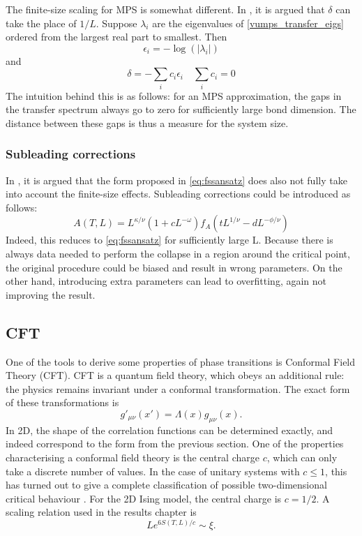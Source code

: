 The finite-size scaling for \Gls{MPS} is somewhat different. In \cite{Vanhecke2019}, it is argued that $\delta$ can take the place of $1/L$. Suppose $\lambda_i$ are the eigenvalues of \cref{vumps_transfer_eigs} ordered from the largest real part to smallest. Then
\begin{equation}
    \epsilon_i = - \log( \left | \lambda_i  \right |  )
\end{equation}
and
\begin{equation} \label{eq:cit_delta}
    \delta = - \sum_i c_i \epsilon_i  \quad \sum_i c_i = 0
\end{equation}
The intuition behind this is as follows: for an \Gls{MPS} approximation, the gaps in the transfer spectrum always go to zero for sufficiently large bond dimension. The distance between these gaps is thus a measure for the system size.

\subsubsection{Subleading corrections}
In \cite{Beach2005}, it is argued that the form proposed in \cref{eq:fssansatz} does also not fully take into account the finite-size effects. Subleading corrections could be introduced as follows:
\begin{equation}\label{ea:subleadparam}
    A(T,L) = L^{\kappa / \nu} ( 1+c L^{-\omega} ) f_A( t L ^{1/ \nu} -d L^{-\phi/\nu} )
\end{equation}
Indeed, this reduces to \cref{eq:fssansatz} for sufficiently large L. Because there is always data needed to perform the collapse in a region around the critical point, the original procedure could be biased and result in wrong parameters. On the other hand, introducing extra parameters can lead to overfitting, again not improving the result.

\subsection{CFT}\label{crit:cft}

One of the tools to derive some properties of phase transitions is Conformal Field Theory (CFT). CFT is a quantum field theory, which obeys an additional rule: the physics remains invariant under a conformal transformation. The exact form of these transformations is
\begin{equation}
    g'_{\mu \nu}(x') = \Lambda(x) g_{\mu \nu}(x) .
\end{equation}
In 2D, the shape of the correlation functions can be determined exactly, and indeed correspond to the form from the previous section. One of the properties characterising a conformal field theory is the central charge $c$, which can only take a discrete number of values.  In the case of unitary systems with $c \leq  1$, this has  turned out to give a complete classification of possible two-dimensional critical behaviour \cite{Ginsparg1988}. For the 2D Ising model, the central charge is $c=1/2$. A scaling relation used in the results chapter is \cite{Calabrese}
\begin{equation}
    L e^{  6 S( T,L ) /c }  \sim   \xi .
\end{equation}

